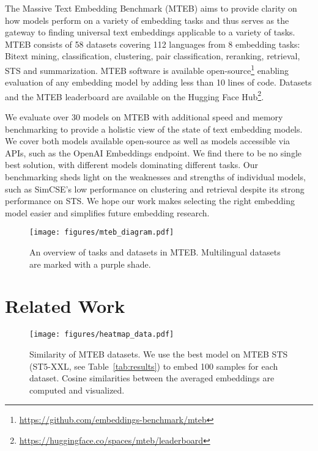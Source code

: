 \documentclass[11pt]{article}
\begin{document}
The Massive Text Embedding Benchmark (MTEB) aims to provide clarity on how models perform on a variety of embedding tasks and thus serves as the gateway to finding universal text embeddings applicable to a variety of tasks. MTEB consists of 58 datasets covering 112 languages from 8 embedding tasks: Bitext mining, classification, clustering, pair classification, reranking, retrieval, STS and summarization. MTEB software is available open-source\footnote{\url{https://github.com/embeddings-benchmark/mteb}} enabling evaluation of any embedding model by adding less than 10 lines of code. Datasets and the MTEB leaderboard are available on the Hugging Face Hub\footnote{\url{https://huggingface.co/spaces/mteb/leaderboard}}.

We evaluate over 30 models on MTEB with additional speed and memory benchmarking to provide a holistic view of the state of text embedding models. We cover both models available open-source as well as models accessible via APIs, such as the OpenAI Embeddings endpoint. We find there to be no single best solution, with different models dominating different tasks. Our benchmarking sheds light on the weaknesses and strengths of individual models, such as SimCSE's \cite{gao2021simcse} low performance on clustering and retrieval despite its strong performance on STS. We hope our work makes selecting the right embedding model easier and simplifies future embedding research.


\begin{figure*}[th]
    \centering
    \begin{center}
        \texttt{[image: figures/mteb\_diagram.pdf]}
        \caption{An overview of tasks and datasets in MTEB. Multilingual datasets are marked with a purple shade.}
        \label{fig:overview}
    \end{center}
\end{figure*}

\section{Related Work}

\begin{figure*}[t]
    \centering
    \begin{center}
\texttt{[image: figures/heatmap\_data.pdf]}
        \caption{Similarity of MTEB datasets. We use the best model on MTEB STS (ST5-XXL, see Table~\ref{tab:results}) to embed 100 samples for each dataset. Cosine similarities between the averaged embeddings are computed and visualized.}
        \label{fig:similarity}
    \end{center}
\end{figure*}
\end{document}

